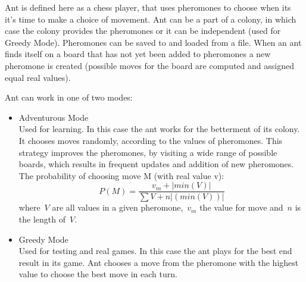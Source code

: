 \documentclass[pdftex]{article}
\begin{document}
Ant is defined here as a chess player, that uses pheromones to choose when its it's time to make a choice of movement. Ant can be a part of a colony, in which case the colony provides the pheromones or it can be independent (used for Greedy Mode). Pheromones can be saved to and loaded from a file. When an ant finds itself on a board that has not yet been added to pheromones a new pheromone is created (possible moves for the board are computed and assigned equal real values).

 Ant can work in one of two modes: 
\begin{itemize}
 	\item Adventurous Mode \hfill \\
		Used for learning. In this case the ant works for the betterment of its colony. It chooses moves randomly, according to the values of pheromones. This strategy improves the pheromones, by visiting a wide range of possible boards, which results in frequent updates and addition of new pheromones. The probability of choosing move M (with real value v):
\begin{equation}
	P(M) = \frac{v_m + |min(V)|}{\sum V + n|(min(V))|}
\end{equation}
where~$V$ are all values in a given pheromone,~$v_m$ the value for move and~$n$ is the length of~$V$.

	\item Greedy Mode \hfill \\
		Used for testing and real games. In this case the ant plays for the best end result in its game. Ant chooses a move from the pheromone with the highest value to choose the best move in each turn.
\end{itemize}
\end{document}

